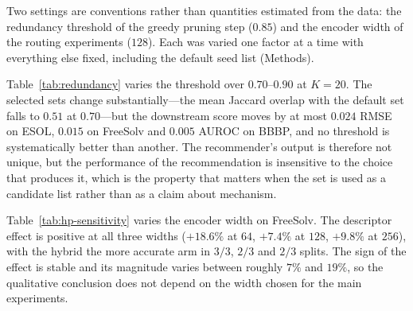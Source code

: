 \documentclass[10pt,a4paper]{article}
\begin{document}
Two settings are conventions rather than quantities estimated from the data: the redundancy threshold of the greedy pruning step ($0.85$) and the encoder width of the routing experiments ($128$). Each was varied one factor at a time with everything else fixed, including the default seed list (Methods).

Table~\ref{tab:redundancy} varies the threshold over $0.70$--$0.90$ at $K=20$. The selected sets change substantially---the mean Jaccard overlap with the default set falls to $0.51$ at $0.70$---but the downstream score moves by at most $0.024$ RMSE on ESOL, $0.015$ on FreeSolv and $0.005$ AUROC on BBBP, and no threshold is systematically better than another. The recommender's output is therefore not unique, but the performance of the recommendation is insensitive to the choice that produces it, which is the property that matters when the set is used as a candidate list rather than as a claim about mechanism.



Table~\ref{tab:hp-sensitivity} varies the encoder width on FreeSolv. The descriptor effect is positive at all three widths ($+18.6\%$ at $64$, $+7.4\%$ at $128$, $+9.8\%$ at $256$), with the hybrid the more accurate arm in $3/3$, $2/3$ and $2/3$ splits. The sign of the effect is stable and its magnitude varies between roughly $7\%$ and $19\%$, so the qualitative conclusion does not depend on the width chosen for the main experiments.


\end{document}
